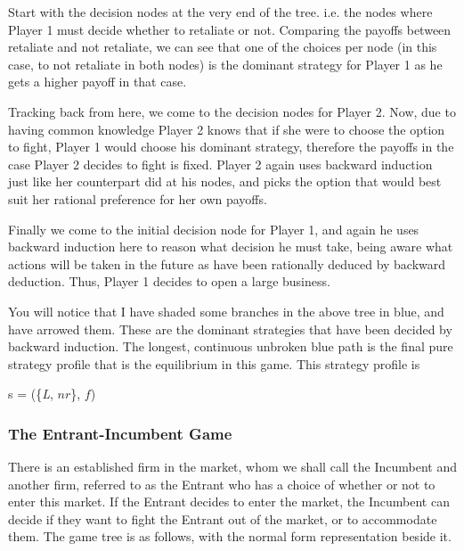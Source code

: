 \documentclass[11pt]{article}
\theoremstyle{definition}
\begin{document}
Start with the decision nodes at the very end of the tree. i.e. the nodes where Player 1 must decide whether to retaliate or not. Comparing the payoffs between retaliate and not retaliate, we can see that one of the choices per node (in this case, to not retaliate in both nodes) is the dominant strategy for Player 1 as he gets a higher payoff in that case.

Tracking back from here, we come to the decision nodes for Player 2. Now, due to having common knowledge Player 2 knows that if she were to choose the option to fight, Player 1 would choose his dominant strategy, therefore the payoffs in the case Player 2 decides to fight is fixed. Player 2 again uses backward induction just like her counterpart did at his nodes, and picks the option that would best suit her rational preference for her own payoffs.

Finally we come to the initial decision node for Player 1, and again he uses backward induction here to reason what decision he must take, being aware what actions will be taken in the future as have been rationally deduced by backward deduction. Thus, Player 1 decides to open a large business.

You will notice that I have shaded some branches in the above tree in blue, and have arrowed them. These are the dominant strategies that have been decided by backward induction. The longest, continuous unbroken blue path is the final pure strategy profile that is the equilibrium in this game. This strategy profile is 

\begin{center}
s = (\{\textit{L}, $nr$\}, $f$)
\end{center}


\subsubsection*{The Entrant-Incumbent Game}

There is an established firm in the market, whom we shall call the Incumbent and another firm, referred to as the Entrant who has a choice of whether or not to enter this market. If the Entrant decides to enter the market, the Incumbent can decide if they want to fight the Entrant out of the market, or to accommodate them. The game tree is as follows, with the normal form representation beside it.
\end{document}

